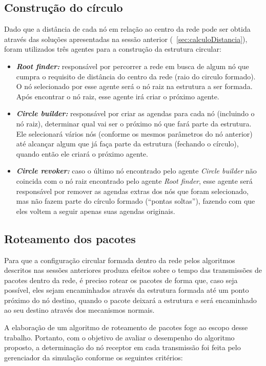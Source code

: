 \subsection{Construção do círculo}
\label{sec:circleBuilding}

Dado que a distância de cada nó em relação ao centro da rede pode ser obtida através das soluções apresentadas na sessão anterior (~\ref{sec:calculoDistancia}), foram utilizados três agentes para a construção da estrutura circular: 

\begin{itemize}
 \item \textbf{\emph{Root finder:}} responsável por percorrer a rede em busca de algum nó que cumpra o requisito de distância do centro da rede (raio do circulo formado). O nó selecionado por esse agente será o nó raiz na estrutura a ser formada. Após encontrar o nó raiz, esse agente irá criar o próximo agente. 
 \item \textbf{\emph{Circle builder:}} responsável por criar as agendas para cada nó (incluindo o nó raiz), determinar qual vai ser o próximo nó que fará parte da estrutura. Ele selecionará vários nós (conforme os mesmos parâmetros do nó anterior) até alcançar algum que já faça parte da estrutura (fechando o círculo), quando então ele criará o próximo agente.
 \item \textbf{\emph{Circle revoker:}} caso o último nó encontrado pelo agente \emph{Circle builder} não coincida com o nó raiz encontrado pelo agente \emph{Root finder}, esse agente será responsável por remover as agendas extras dos nós que foram selecionado, mas não fazem parte do círculo formado (``pontas soltas''), fazendo com que eles voltem a seguir apenas suas agendas originais.
\end{itemize}

\subsection{Roteamento dos pacotes}

Para que a configuração circular formada dentro da rede pelos algoritmos descritos nas sessões anteriores produza efeitos sobre o tempo das transmissões de pacotes dentro da rede, é preciso rotear os pacotes de forma que, caso seja possível, eles sejam encaminhados através da estrutura formada até um ponto próximo do nó destino, quando o pacote deixará a estrutura e será encaminhado ao seu destino através dos mecanismos normais. 

A elaboração de um algoritmo de roteamento de pacotes foge ao escopo desse trabalho. Portanto, com o objetivo de avaliar o desempenho do algoritmo proposto, a determinação do nó receptor em cada transmissão foi feita pelo gerenciador da simulação conforme os seguintes critérios:

